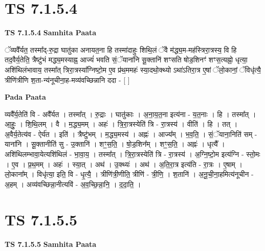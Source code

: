 \documentclass[17pt]{extarticle}
\begin{document}
\section*{ TS 7.1.5.4 }

\textbf{TS 7.1.5.4 } \newline
\textbf{Samhita Paata} \newline

ॅव्यवै᳚र्यत॒ तस्मा᳚द्-रु॒द्रा घातु॑का अनायत॒ना हि तस्मा॑दाहुः शिथि॒लं ॅवै म॑द्ध्य॒म-मह॑स्त्रिरा॒त्रस्य॒ वि हि तद॒वैर्य॒तेति॒ त्रैष्टु॑भं मद्ध्य॒मस्याह्न॒ आज्यं॑ भवति सं॒ॅयाना॑नि सू॒क्तानि॑ शꣳसति षोड॒शिनꣳ॑ शꣳस॒त्यह्नो॒ धृत्या॒ अशि॑थिलंभावाय॒ तस्मा᳚त् त्रिरा॒त्रस्या᳚ग्निष्टो॒म ए॒व प्र॑थ॒ममहः॑ स्या॒दथो॒क्थ्यो ऽथा॑ऽतिरा॒त्र ए॒षां ॅलो॒कानां॒ ॅविधृ॑त्यै॒ त्रीणि॑त्रीणि श॒ता-न्य॑नूचीना॒ह-मव्य॑वच्छिन्नानि ददा - [  ] \newline

\textbf{Pada Paata} \newline

व्यवै᳚र्य॒तेति॑ वि - अवै᳚र्यत । तस्मा᳚त् । रु॒द्राः । घातु॑काः । अ॒ना॒य॒त॒ना इत्य॑ना - य॒त॒नाः । हि । तस्मा᳚त् । आ॒हुः॒ । शि॒थि॒लम् । वै । म॒द्ध्य॒मम् । अहः॑ । त्रि॒रा॒त्रस्येति॑ त्रि - रा॒त्रस्य॑ । वीति॑ । हि । तत् । अ॒वैर्य॒तेत्य॑व - ऐर्य॑त । इति॑ । त्रैष्टु॑भम् । म॒द्ध्य॒मस्य॑ । अह्नः॑ । आज्य᳚म् । भ॒व॒ति॒ । सं॒ॅयाना॒निति॑ सम् - याना॑नि । सू॒क्तानीति॑ सु - उ॒क्तानि॑ । शꣳ॒॒स॒ति॒ । षो॒ड॒शिन᳚म् । शꣳ॒॒स॒ति॒ । अह्नः॑ । धृत्यै᳚ । अशि॑थिलम्भावा॒येत्यशि॑थिलं - भा॒वा॒य॒ । तस्मा᳚त् । त्रि॒रा॒त्रस्येति॑ त्रि - रा॒त्रस्य॑ । अ॒ग्नि॒ष्टो॒म इत्य॑ग्नि - स्तो॒मः । ए॒व । प्र॒थ॒मम् । अहः॑ । स्या॒त् । अथ॑ । उ॒क्थ्यः॑ । अथ॑ । अ॒ति॒रा॒त्र इत्य॑ति - रा॒त्रः । ए॒षाम् । लो॒काना᳚म् । विधृ॑त्या॒ इति॒ वि - धृ॒त्यै॒ । त्रीणि॑त्री॒णीति॒ त्रीणि॑ - त्री॒णि॒ । श॒तानि॑ । अ॒नू॒ची॒ना॒हमित्य॑नूचीन - अ॒हम् । अव्य॑वच्छिन्ना॒नीत्यवि॑ - अ॒व॒च्छि॒न्ना॒नि॒ । द॒दा॒ति॒ ।  \newline




\section*{ TS 7.1.5.5 }

\textbf{TS 7.1.5.5 } \newline
\textbf{Samhita Paata} \newline
\end{document}
